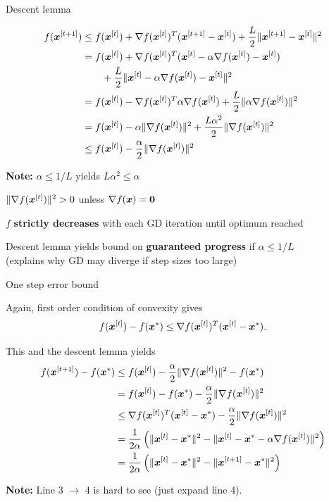 \documentclass[11pt,compress,t,notes=noshow, xcolor=table]{beamer}
\begin{document}
\begin{framei}[fs=small]{Descent lemma}
\item[] \begin{align*}
f(\bm{x}^{[t+1]}) &\leq f(\bm{x}^{[t]}) + \nabla f(\bm{x}^{[t]})^T(\bm{x}^{[t+1]} - \bm{x}^{[t]}) + \frac{L}{2} \|\bm{x}^{[t+1]} - \bm{x}^{[t]}\|^2 \\
&= f(\bm{x}^{[t]}) + \nabla f(\bm{x}^{[t]})^T(\bm{x}^{[t]} - \alpha \nabla f(\bm{x}^{[t]}) - \bm{x}^{[t]}) \\
&\qquad + \frac{L}{2} \|\bm{x}^{[t]} - \alpha \nabla f(\bm{x}^{[t]}) - \bm{x}^{[t]}\|^2 \\
&= f(\bm{x}^{[t]}) - \nabla f(\bm{x}^{[t]})^T \alpha  \nabla f(\bm{x}^{[t]}) + \frac{L}{2} \|\alpha \nabla f(\bm{x}^{[t]})\|^2 \\
&= f(\bm{x}^{[t]}) - \alpha \|\nabla f(\bm{x}^{[t]})\|^2 + \frac{L \alpha^2}{2} \|\nabla f(\bm{x}^{[t]})\|^2 \\
&\le f(\bm{x}^{[t]}) - \frac{\alpha}{2} \|\nabla f(\bm{x}^{[t]})\|^2
\end{align*}
\item\textbf{Note:} $\alpha \leq 1/L$ yields $L \alpha^2 \leq \alpha$
\begin{itemizeS}
\item $\|\nabla f(\bm{x}^{[t]})\|^2 > 0$ unless $\nabla f(\bm{x}) = \mathbf{0}$
\item $f$ \textbf{strictly decreases} with each GD iteration until optimum reached
\item Descent lemma yields bound on \textbf{guaranteed progress} if $\alpha \leq 1/L$ \\
(explains why GD may diverge if step sizes too large)
\end{itemizeS}
\end{framei}


\begin{framei}{One step error bound}
\item Again, first order condition of convexity gives
$$f(\bm{x}^{[t]}) - f(\bm{x}^\ast) \leq  \nabla f(\bm{x}^{[t]})^T (\bm{x}^{[t]} - \bm{x}^\ast).$$
\item This and the descent lemma yields
\begin{align*}
f(\bm{x}^{[t+1]}) - f(\bm{x}^\ast) &\leq f(\bm{x}^{[t]})  - \frac{\alpha}{2}\|\nabla f(\bm{x}^{[t]})\|^2  - f(\bm{x}^\ast) \\
&= f(\bm{x}^{[t]})  - f(\bm{x}^\ast)  - \frac{\alpha}{2}\|\nabla f(\bm{x}^{[t]})\|^2 \\
&\leq \nabla f(\bm{x}^{[t]})^T (\bm{x}^{[t]}-\bm{x}^\ast) - \frac{\alpha}{2}\|\nabla f(\bm{x}^{[t]})\|^2 \\
&= \frac{1}{2 \alpha} \left( \|\bm{x}^{[t]}-\bm{x}^\ast\|^2 - \| \bm{x}^{[t]} - \bm{x}^\ast - \alpha \nabla f(\bm{x}^{[t]})\|^2 \right) \\
&= \frac{1}{2 \alpha} \left( \|\bm{x}^{[t]}-\bm{x}^\ast\|^2 - \| \bm{x}^{[t+1]} - \bm{x}^\ast \|^2 \right)
\end{align*}
\item\textbf{Note:} Line 3 $\to$ 4 is hard to see (just expand line 4).
\end{framei}
\end{document}
